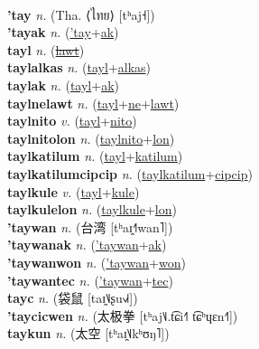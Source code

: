  \label{'ta} \\
\textbf{'tay} \textit{n.} (Tha. ⟨ไทย⟩ [tʰaj˧])
 \label{'tay} \\
\textbf{'tayak} \textit{n.} (\hyperref['tay]{'tay}+\hyperref[ak]{ak})
 \label{'tayak} \\
\textbf{tayl} \textit{n.} (\hyperref[lawt]{\sout{lawt}})
 \label{tayl} \\
\textbf{taylalkas} \textit{n.} (\hyperref[tayl]{tayl}+\hyperref[alkas]{alkas})
 \label{taylalkas} \\
\textbf{taylak} \textit{n.} (\hyperref[tayl]{tayl}+\hyperref[ak]{ak})
 \label{taylak} \\
\textbf{taylnelawt} \textit{n.} (\hyperref[tayl]{tayl}+\hyperref[ne]{ne}+\hyperref[lawt]{lawt})
 \label{taylnelawt} \\
\textbf{taylnito} \textit{v.} (\hyperref[tayl]{tayl}+\hyperref[nito]{nito})
 \label{taylnito} \\
\textbf{taylnitolon} \textit{n.} (\hyperref[taylnito]{taylnito}+\hyperref[lon]{lon})
 \label{taylnitolon} \\
\textbf{taylkatilum} \textit{n.} (\hyperref[tayl]{tayl}+\hyperref[katilum]{katilum})
 \label{taylkatilum} \\
\textbf{taylkatilumcipcip} \textit{n.} (\hyperref[taylkatilum]{taylkatilum}+\hyperref[cipcip]{cipcip})
 \label{taylkatilumcipcip} \\
\textbf{taylkule} \textit{v.} (\hyperref[tayl]{tayl}+\hyperref[kule]{kule})
 \label{taylkule} \\
\textbf{taylkulelon} \textit{n.} (\hyperref[taylkule]{taylkule}+\hyperref[lon]{lon})
 \label{taylkulelon} \\
\textbf{'taywan} \textit{n.} ({\chinese{}台湾} [tʰaɪ̯˧˥wan˥])
 \label{'taywan} \\
\textbf{'taywanak} \textit{n.} (\hyperref['taywan]{'taywan}+\hyperref[ak]{ak})
 \label{'taywanak} \\
\textbf{'taywanwon} \textit{n.} (\hyperref['taywan]{'taywan}+\hyperref[won]{won})
 \label{'taywanwon} \\
\textbf{'taywantec} \textit{n.} (\hyperref['taywan]{'taywan}+\hyperref[tec]{tec})
 \label{'taywantec} \\
\textbf{tayc} \textit{n.} ({\chinese{}袋鼠} [taɪ̯˥˩ʂu˧˩˧])
 \label{tayc} \\
\textbf{'taycicwen} \textit{n.} ({\chinese{}太极拳} [tʰaj˥˩.t͡ɕi˧˥ t͡ɕʰɥɛn˧˥])
 \label{'taycicwen} \\
\textbf{taykun} \textit{n.} ({\chinese{}太空} [tʰaɪ̯˥˩kʰʊŋ˥])
 \label{taykun} \\
